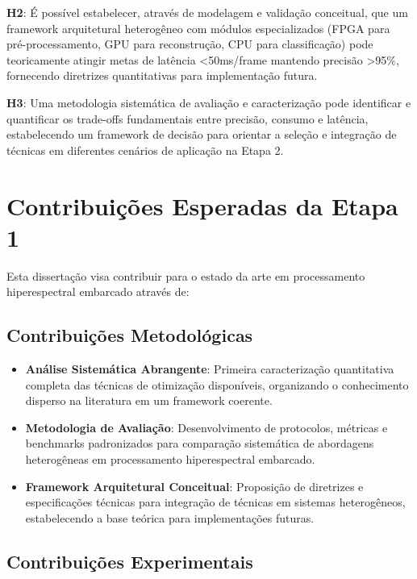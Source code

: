 \textbf{H2}: É possível estabelecer, através de modelagem e validação conceitual, que um framework arquitetural heterogêneo com módulos especializados (FPGA para pré-processamento, GPU para reconstrução, CPU para classificação) pode teoricamente atingir metas de latência <50ms/frame mantendo precisão >95\%, fornecendo diretrizes quantitativas para implementação futura.

\textbf{H3}: Uma metodologia sistemática de avaliação e caracterização pode identificar e quantificar os trade-offs fundamentais entre precisão, consumo e latência, estabelecendo um framework de decisão para orientar a seleção e integração de técnicas em diferentes cenários de aplicação na Etapa 2.

\section{Contribuições Esperadas da Etapa 1}

Esta dissertação visa contribuir para o estado da arte em processamento hiperespectral embarcado através de:

\subsection{Contribuições Metodológicas}

\begin{itemize}
\item \textbf{Análise Sistemática Abrangente}: Primeira caracterização quantitativa completa das técnicas de otimização disponíveis, organizando o conhecimento disperso na literatura em um framework coerente.

\item \textbf{Metodologia de Avaliação}: Desenvolvimento de protocolos, métricas e benchmarks padronizados para comparação sistemática de abordagens heterogêneas em processamento hiperespectral embarcado.

\item \textbf{Framework Arquitetural Conceitual}: Proposição de diretrizes e especificações técnicas para integração de técnicas em sistemas heterogêneos, estabelecendo a base teórica para implementações futuras.
\end{itemize}

\subsection{Contribuições Experimentais}

